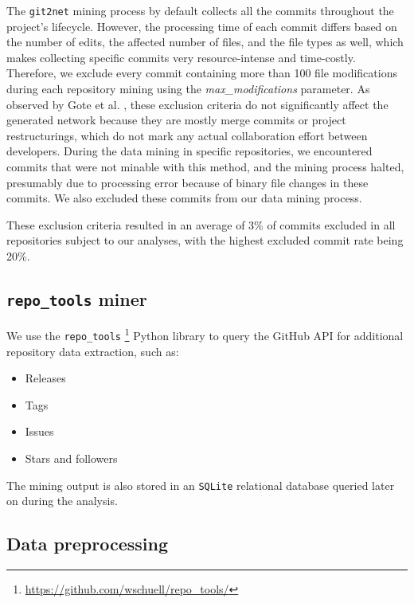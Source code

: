 The \texttt{git2net} mining process by default collects all the commits throughout the project's lifecycle. However, the processing time of each commit differs based on the number of edits, the affected number of files, and the file types as well, which makes collecting specific commits very resource-intense and time-costly. Therefore, we exclude every commit containing more than 100 file modifications during each repository mining using the \textit{max\_modifications} parameter. As observed by Gote et al. \cite{goteAnalysingTimeStampedCoEditing2019}, these exclusion criteria do not significantly affect the generated network because they are mostly merge commits or project restructurings, which do not mark any actual collaboration effort between developers. During the data mining in specific repositories, we encountered commits that were not minable with this method, and the mining process halted, presumably due to processing error because of binary file changes in these commits. We also excluded these commits from our data mining process.

These exclusion criteria resulted in an average of 3\% of commits excluded in all repositories subject to our analyses, with the highest excluded commit rate being 20\%.

\subsection{\texttt{repo\_tools} miner} 

We use the \texttt{repo\_tools} \footnote{\url{https://github.com/wschuell/repo\_tools/}} Python library to query the GitHub API for additional repository data extraction, such as:

\begin{itemize}
    \item Releases
    \item Tags
    \item Issues
    \item Stars and followers
\end{itemize}

The mining output is also stored in an \texttt{SQLite} relational database queried later on during the analysis. 


\subsection{Data preprocessing}

